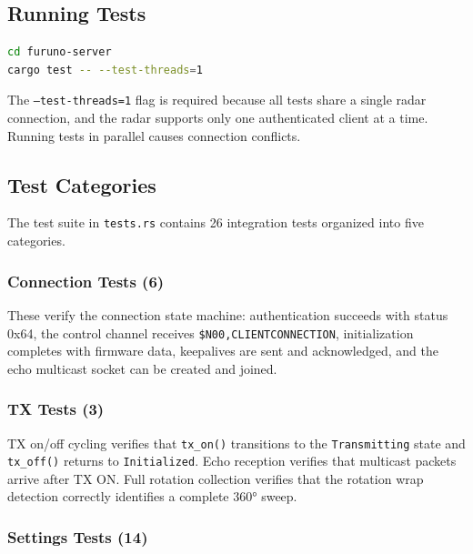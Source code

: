 \documentclass[11pt,letterpaper]{article}
\begin{document}
\subsection{Running Tests}
\label{subsec:running-tests}

\begin{lstlisting}[language=bash]
cd furuno-server
cargo test -- --test-threads=1
\end{lstlisting}

The \texttt{--test-threads=1} flag is required because all tests share a single radar connection, and the radar supports only one authenticated client at a time. Running tests in parallel causes connection conflicts.

\subsection{Test Categories}
\label{subsec:test-categories}

The test suite in \texttt{tests.rs} contains 26 integration tests organized into five categories.

\subsubsection{Connection Tests (6)}
\label{subsubsec:test-connection}

These verify the connection state machine: authentication succeeds with status 0x64, the control channel receives \texttt{\$N00,CLIENTCONNECTION}, initialization completes with firmware data, keepalives are sent and acknowledged, and the echo multicast socket can be created and joined.

\subsubsection{TX Tests (3)}
\label{subsubsec:test-tx}

TX on/off cycling verifies that \texttt{tx\_on()} transitions to the \texttt{Transmitting} state and \texttt{tx\_off()} returns to \texttt{Initialized}. Echo reception verifies that multicast packets arrive after TX ON. Full rotation collection verifies that the rotation wrap detection correctly identifies a complete $360°$ sweep.

\subsubsection{Settings Tests (14)}
\label{subsubsec:test-settings}
\end{document}
